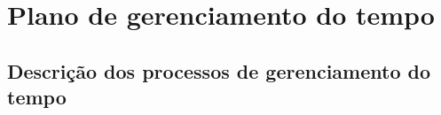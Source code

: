 
\chapter{Plano de gerenciamento do tempo}

\section{Descrição dos processos de gerenciamento do tempo}

